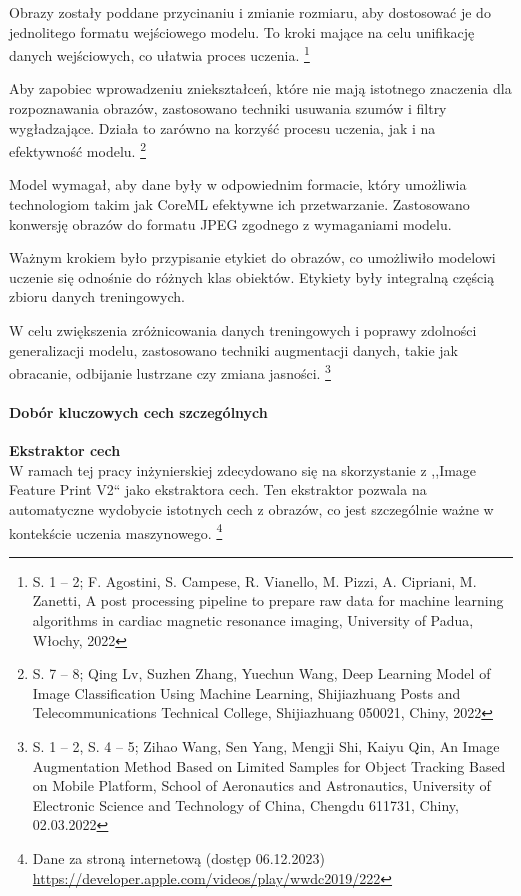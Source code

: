 \documentclass[12pt, a4paper, twoside, openany]{book}
\newcommand{\forceindent}{\leavevmode{\parindent=1.3em\indent}}
\begin{document}
{%
Obrazy zostały poddane przycinaniu i zmianie rozmiaru, aby dostosować je do jednolitego formatu wejściowego modelu.
To kroki mające na celu unifikację danych wejściowych, co ułatwia proces uczenia. \footnote{
    S. 1 -- 2; F. Agostini, S. Campese, R. Vianello, M. Pizzi, A. Cipriani, M. Zanetti, A post processing pipeline to prepare raw data for machine learning algorithms in cardiac magnetic resonance imaging, University of Padua, Włochy, 2022
}

Aby zapobiec wprowadzeniu zniekształceń, które nie mają istotnego znaczenia dla rozpoznawania obrazów, zastosowano techniki usuwania szumów i filtry wygładzające.
Działa to zarówno na korzyść procesu uczenia, jak i na efektywność modelu. \footnote{S. 7 -- 8; Qing Lv, Suzhen Zhang, Yuechun Wang, Deep Learning Model of Image Classification Using
    Machine Learning, Shijiazhuang Posts and Telecommunications Technical College, Shijiazhuang 050021, Chiny, 2022}

Model wymagał, aby dane były w odpowiednim formacie, który umożliwia technologiom takim jak CoreML efektywne ich przetwarzanie.
Zastosowano konwersję obrazów do formatu JPEG zgodnego z wymaganiami modelu.

Ważnym krokiem było przypisanie etykiet do obrazów, co umożliwiło modelowi uczenie się odnośnie do różnych klas obiektów.
Etykiety były integralną częścią zbioru danych treningowych.

W celu zwiększenia zróżnicowania danych treningowych i poprawy zdolności generalizacji modelu, zastosowano techniki augmentacji danych, takie jak obracanie, odbijanie lustrzane czy zmiana jasności. \footnote{ S. 1 -- 2, S. 4 -- 5; Zihao Wang, Sen Yang, Mengji Shi, Kaiyu Qin, An Image Augmentation Method Based on Limited Samples for Object Tracking Based on Mobile Platform, School of Aeronautics and Astronautics, University of Electronic Science and Technology of China, Chengdu 611731, Chiny, 02.03.2022 }

\paragraph{Dobór kluczowych cech szczególnych\\}
\forceindent \textbf{ Ekstraktor cech\\}
\indent W ramach tej pracy inżynierskiej zdecydowano się na skorzystanie z ,,Image Feature Print V2`` jako ekstraktora cech.
Ten ekstraktor pozwala na automatyczne wydobycie istotnych cech z obrazów, co jest szczególnie ważne w kontekście uczenia maszynowego. \footnote{Dane za stroną internetową (dostęp 06.12.2023) \url{https://developer.apple.com/videos/play/wwdc2019/222}}

}
\end{document}
